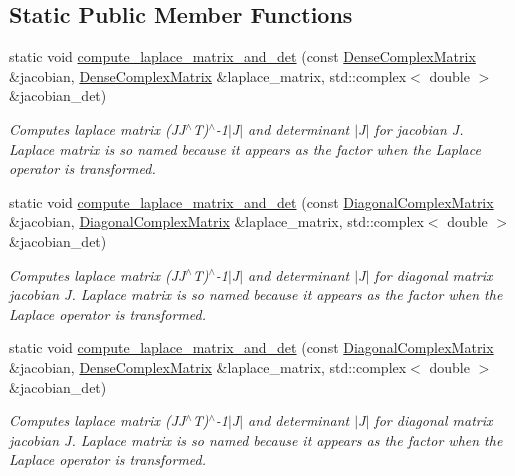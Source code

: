 \subsection*{Static Public Member Functions}
\begin{DoxyCompactItemize}
\item 
static void \hyperlink{classoomph_1_1PMLElementBase_a172a01ea5c2887c9555697a1b1878582}{compute\+\_\+laplace\+\_\+matrix\+\_\+and\+\_\+det} (const \hyperlink{classoomph_1_1DenseComplexMatrix}{Dense\+Complex\+Matrix} \&jacobian, \hyperlink{classoomph_1_1DenseComplexMatrix}{Dense\+Complex\+Matrix} \&laplace\+\_\+matrix, std\+::complex$<$ double $>$ \&jacobian\+\_\+det)
\begin{DoxyCompactList}\small\item\em Computes laplace matrix (J\+J$^\wedge$T)$^\wedge$-\/1$\vert$\+J$\vert$ and determinant $\vert$\+J$\vert$ for jacobian J. Laplace matrix is so named because it appears as the factor when the Laplace operator is transformed. \end{DoxyCompactList}\item 
static void \hyperlink{classoomph_1_1PMLElementBase_af0b8dec31cb5d4acc0ca7628f895b583}{compute\+\_\+laplace\+\_\+matrix\+\_\+and\+\_\+det} (const \hyperlink{classoomph_1_1DiagonalComplexMatrix}{Diagonal\+Complex\+Matrix} \&jacobian, \hyperlink{classoomph_1_1DiagonalComplexMatrix}{Diagonal\+Complex\+Matrix} \&laplace\+\_\+matrix, std\+::complex$<$ double $>$ \&jacobian\+\_\+det)
\begin{DoxyCompactList}\small\item\em Computes laplace matrix (J\+J$^\wedge$T)$^\wedge$-\/1$\vert$\+J$\vert$ and determinant $\vert$\+J$\vert$ for diagonal matrix jacobian J. Laplace matrix is so named because it appears as the factor when the Laplace operator is transformed. \end{DoxyCompactList}\item 
static void \hyperlink{classoomph_1_1PMLElementBase_a3ce714da2e70d7237265f240ad0e0aaa}{compute\+\_\+laplace\+\_\+matrix\+\_\+and\+\_\+det} (const \hyperlink{classoomph_1_1DiagonalComplexMatrix}{Diagonal\+Complex\+Matrix} \&jacobian, \hyperlink{classoomph_1_1DenseComplexMatrix}{Dense\+Complex\+Matrix} \&laplace\+\_\+matrix, std\+::complex$<$ double $>$ \&jacobian\+\_\+det)
\begin{DoxyCompactList}\small\item\em Computes laplace matrix (J\+J$^\wedge$T)$^\wedge$-\/1$\vert$\+J$\vert$ and determinant $\vert$\+J$\vert$ for diagonal matrix jacobian J. Laplace matrix is so named because it appears as the factor when the Laplace operator is transformed. \end{DoxyCompactList}\item 

\end{DoxyCompactItemize}
